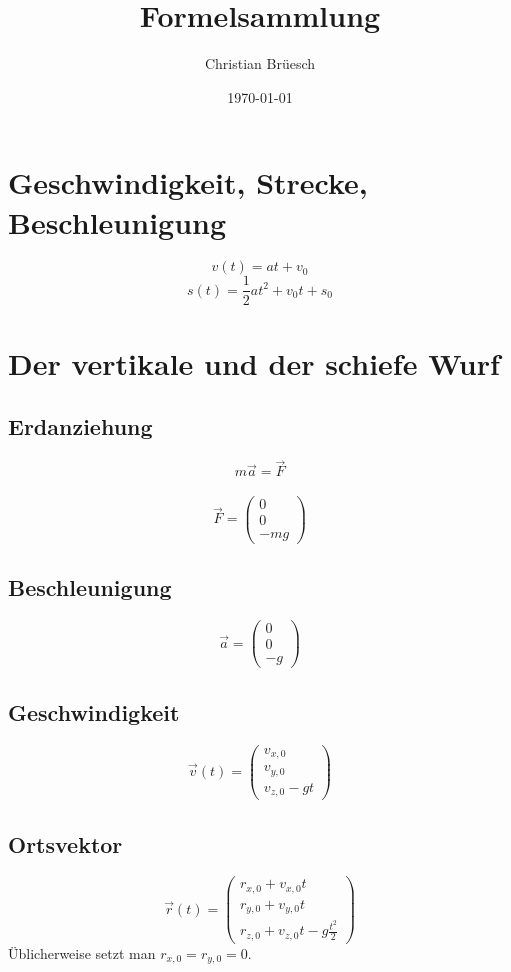 \documentclass[11pt]{article}
\title{Formelsammlung}
\date{\today}
\author{Christian Brüesch}
\begin{document}
\tableofcontents
\maketitle
\section{Geschwindigkeit, Strecke, Beschleunigung}
$$v(t) = at + v_0$$
$$s(t) = \frac{1}{2}at^2 + v_0t + s_0$$
\section{Der vertikale und der schiefe Wurf}
\subsection{Erdanziehung}
$$m\overrightarrow{a} = \overrightarrow{F}$$\\
$$\overrightarrow{F}=\left(\begin{array}{c}
0\\
0\\
-mg
\end{array}\right)$$
\subsection{Beschleunigung}
$$\overrightarrow{a} = \left( \begin{array}{c}
0\\
0\\
-g
\end{array} \right)$$
\subsection{Geschwindigkeit}
$$\overrightarrow{v}(t) = \left( \begin{array}{c}
v_{x,0}\\
v_{y,0}\\
v_{z,0} - gt
\end{array} \right) $$
\subsection{Ortsvektor}
$$\overrightarrow{r}(t) = \left( \begin{array}{c}
r_{x,0} + v_{x,0}t\\
r_{y,0} + v_{y,0}t\\
r_{z,0} + v_{z,0}t - g\frac{t^2}{2}
\end{array} \right) $$
Üblicherweise setzt man $r_{x,0} = r_{y,0} = 0$.
\end{document}
